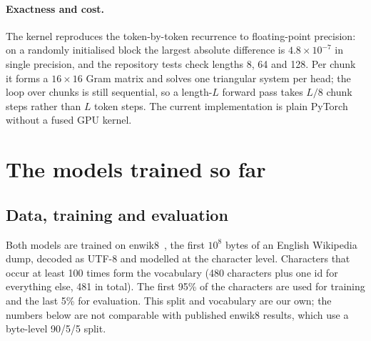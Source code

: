 \documentclass[10pt]{article}
\begin{document}
\paragraph{Exactness and cost.} The kernel reproduces the token-by-token recurrence to floating-point
precision: on a randomly initialised block the largest absolute difference is $4.8\times10^{-7}$ in
single precision, and the repository tests check lengths 8, 64 and 128. Per chunk it forms a
$16\times16$ Gram matrix and solves one triangular system per head; the loop over chunks is still
sequential, so a length-$L$ forward pass takes $L/8$ chunk steps rather than $L$ token steps. The current
implementation is plain PyTorch without a fused GPU kernel.

\section{The models trained so far}
\label{sec:results}

\subsection{Data, training and evaluation}

Both models are trained on enwik8~\cite{hutter2006}, the first $10^8$ bytes of an English Wikipedia
dump, decoded as UTF-8 and modelled at the character level. Characters that occur at least 100 times form
the vocabulary (480 characters plus one id for everything else, 481 in total). The first 95\% of the
characters are used for training and the last 5\% for evaluation. This split and vocabulary are our own;
the numbers below are not comparable with published enwik8 results, which use a byte-level 90/5/5 split.
\end{document}
